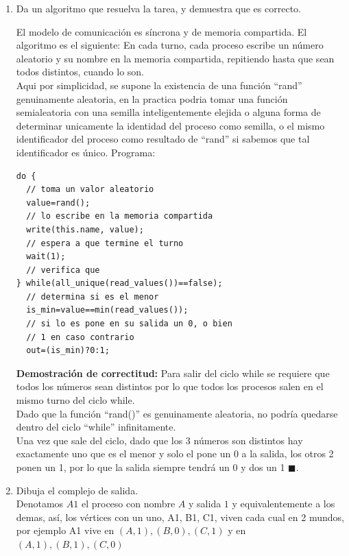 \documentclass{article}
\begin{document}
\begin{enumerate}
\begin{enumerate}
\item Da un algoritmo que resuelva la tarea, y demuestra que es correcto.

El modelo de comunicación es síncrona y de memoria compartida.
El algoritmo es el siguiente:
En cada turno, cada proceso escribe un número aleatorio y su nombre en la memoria compartida, repitiendo hasta que sean todos distintos, cuando lo son.\\

Aqui por simplicidad, se supone la existencia de una función ``rand'' genuinamente aleatoria, en la practica podria tomar una función semialeatoria con una semilla inteligentemente elejida o alguna forma de determinar unicamente la identidad del proceso como semilla, o el mismo identificador del proceso como resultado de ``rand'' si sabemos que tal identificador es único.
\newpage
Programa:\\
\begin{lstlisting}[frame=single]
do {
  // toma un valor aleatorio
  value=rand();                        
  // lo escribe en la memoria compartida
  write(this.name, value);             
  // espera a que termine el turno
  wait(1);                   
  // verifica que        
} while(all_unique(read_values())==false); 
  // determina si es el menor
  is_min=value==min(read_values());
  // si lo es pone en su salida un 0, o bien
  // 1 en caso contrario
  out=(is_min)?0:1;       
\end{lstlisting}

{\bf Demostración de correctitud:}
Para salir del ciclo while se requiere que todos los números sean distintos por lo que todos los procesos salen en el mismo turno del ciclo while.\\
Dado que la función ``rand()'' es genuinamente aleatoria, no podría quedarse dentro del ciclo ``while'' infinitamente.\\
Una vez que sale del ciclo, dado que los 3 números son distintos hay exactamente uno que es el menor y solo el pone un 0 a la salida, los otros 2 ponen un 1, por lo que la salida siempre tendrá un 0 y dos un 1 $\blacksquare$.

\item Dibuja el complejo de salida.\\
Denotamos $A1$ el proceso con nombre $A$ y salida $1$ y equivalentemente a los demas, así, los vértices con un uno, A1, B1, C1, viven cada cual en 2 mundos, por ejemplo A1 vive en ${(A,1),(B,0),(C,1)}$ y en ${(A,1),(B,1),(C,0)}$  


\end{enumerate}
\end{enumerate}
\end{document}
